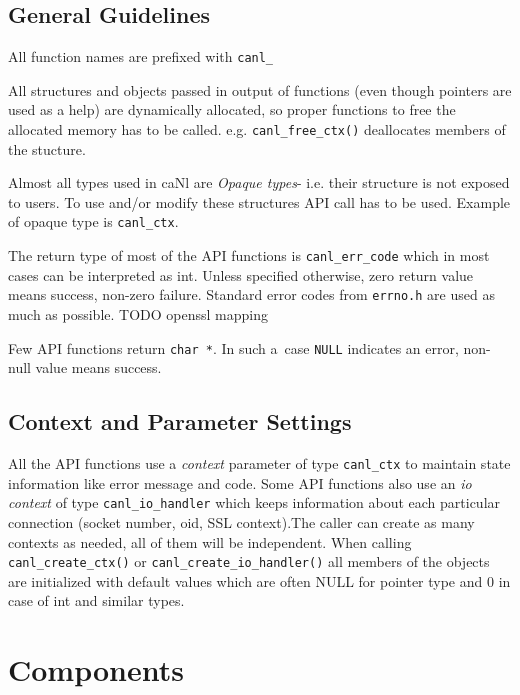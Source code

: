 \subsection{General Guidelines}

%
All function names are prefixed with \verb'canl_'

%
All structures and objects passed in output of functions
(even though pointers are used as a help)
are dynamically allocated, so proper functions to free the allocated 
memory has to be called. e.g. \verb'canl_free_ctx()' 
deallocates members of the stucture.

%
Almost all types used in caNl are \textit{Opaque types}- i.e. their structure is 
not exposed to users. To use and/or modify these structures API call has 
to be used. Example of opaque type is {\tt canl\_ctx}.

%
The return type of most of the API functions is {\tt canl\_err\_code} which
 in most cases can be interpreted as int. Unless specified otherwise, zero
return value means success, non-zero failure. Standard error codes from 
{\tt errno.h} are used as much as possible.
TODO openssl mapping

Few API functions return {\tt char *}. In such a~case
{\tt NULL} indicates an error, non-null value means success.

\subsection{Context and Parameter Settings}
\label{s:context}
All the API functions use a \emph{context} parameter of type {\tt canl\_ctx} 
to maintain state information like error message and code. 
Some API functions also use an \emph{io context} of type {\tt canl\_io\_handler}
which keeps information about each particular connection 
(\eg socket number, oid, SSL context).The caller can create as many 
contexts as needed, all of them will be independent. When calling
\verb'canl_create_ctx()' or \verb'canl_create_io_handler()' all members 
of the objects are initialized with default values which are often 
NULL for pointer type and 0 in case of int and similar types.

\section{\CANL Components}
\label{s:common}

